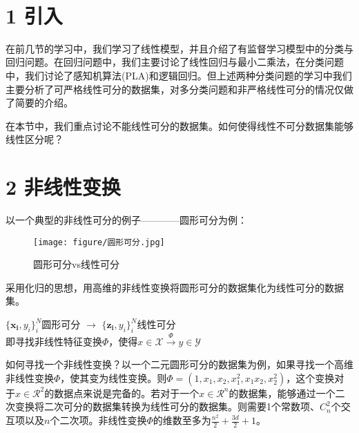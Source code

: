 \documentclass[twoside]{article}
\begin{document}
\clearpage
	 \vspace{2mm} \\
\section*{1 引入}
在前几节的学习中，我们学习了线性模型，并且介绍了有监督学习模型中的分类与回归问题。在回归问题中，我们主要讨论了线性回归与最小二乘法，在分类问题中，我们讨论了感知机算法(PLA)和逻辑回归。但上述两种分类问题的学习中我们主要分析了可严格线性可分的数据集，对多分类问题和非严格线性可分的情况仅做了简要的介绍。

在本节中，我们重点讨论不能线性可分的数据集。如何使得线性不可分数据集能够线性区分呢？
\section*{2 非线性变换}
以一个典型的非线性可分的例子————圆形可分为例：
\begin{figure}[h]
    \centering
    \texttt{[image: figure/圆形可分.jpg]}
    \caption{圆形可分vs线性可分}
\end{figure}
采用化归的思想，用高维的非线性变换将圆形可分的数据集化为线性可分的数据集。
\begin{center}
    $\{\boldsymbol{x_i},y_i\}_i^N$圆形可分 $\longrightarrow$ $\{\boldsymbol{z_i},y_i\}_i^N$线性可分\\
    即寻找非线性特征变换$\varPhi$，使得$x\in \mathcal{X}\xrightarrow{\varPhi}y\in \mathcal{Y}$
\end{center}
如何寻找一个非线性变换？以一个二元圆形可分的数据集为例，如果寻找一个高维非线性变换$\varPhi$，使其变为线性变换。则$\varPhi=(1,x_1,x_2,x_1^2,x_1x_2,x_2^2)$，这个变换对于$x\in \mathcal{R}^2$的数据点来说是完备的。若对于一个$x \in \mathcal{R}^n$的数据集，能够通过一个二次变换将二次可分的数据集转换为线性可分的数据集。则需要1个常数项、$C_n^2$个交互项以及$n$个二次项。非线性变换$\varPhi$的维数至多为$\frac{n^2}{2}+\frac{3d}{2}+1$。
\end{document}
